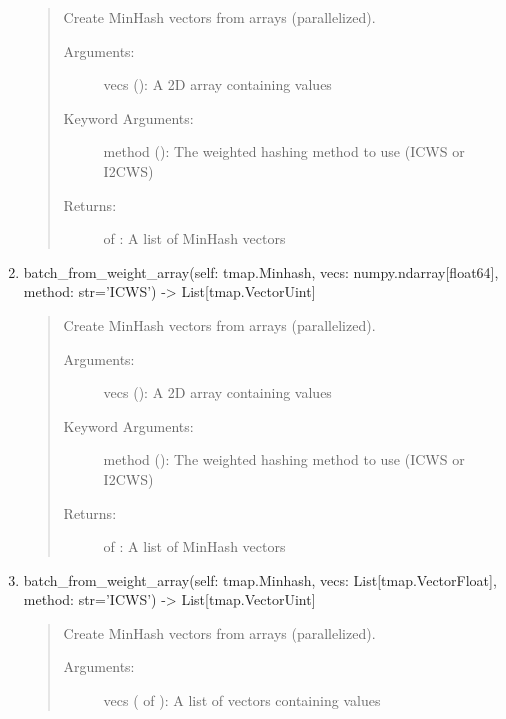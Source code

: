 \documentclass[letterpaper,10pt,english]{sphinxmanual}
\begin{document}
\begin{fulllineitems}
\begin{fulllineitems}
\begin{enumerate}
\begin{quote}
Create MinHash vectors from  arrays (parallelized).
\begin{description}
\item[{Arguments:}] \leavevmode
vecs (): A 2D array containing  values

\item[{Keyword Arguments:}] \leavevmode
method (): The weighted hashing method to use (ICWS or I2CWS)

\item[{Returns:}] \leavevmode
{} of : A list of MinHash vectors

\end{description}
\end{quote}

\item {} 
batch\_from\_weight\_array(self: tmap.Minhash, vecs: numpy.ndarray{[}float64{]}, method: str=’ICWS’) -\textgreater{} List{[}tmap.VectorUint{]}
\begin{quote}

Create MinHash vectors from  arrays (parallelized).
\begin{description}
\item[{Arguments:}] \leavevmode
vecs (): A 2D array containing  values

\item[{Keyword Arguments:}] \leavevmode
method (): The weighted hashing method to use (ICWS or I2CWS)

\item[{Returns:}] \leavevmode
{} of : A list of MinHash vectors

\end{description}
\end{quote}

\item {} 
batch\_from\_weight\_array(self: tmap.Minhash, vecs: List{[}tmap.VectorFloat{]}, method: str=’ICWS’) -\textgreater{} List{[}tmap.VectorUint{]}
\begin{quote}

Create MinHash vectors from  arrays (parallelized).
\begin{description}
\item[{Arguments:}] \leavevmode
vecs ( of ): A list of vectors containing  values


\end{description}
\end{quote}
\end{enumerate}
\end{fulllineitems}
\end{fulllineitems}
\end{document}
